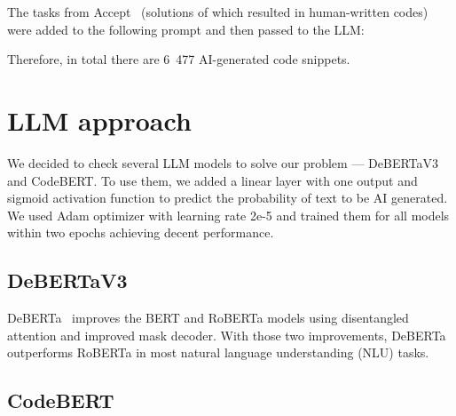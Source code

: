 \documentclass{article}
\begin{document}
The tasks from Accept~\cite{Beresnev} (solutions of which resulted in human-written codes) were added to the following prompt and then passed to the LLM:

\medskip
{}
\medskip

Therefore, in total there are 6~477 AI-generated code snippets.

\section{LLM approach}

We decided to check several LLM models to solve our problem --- DeBERTaV3 and CodeBERT. To use them, we added a linear layer with one output and sigmoid activation function to predict the probability of text to be AI generated. We used Adam optimizer with learning rate 2e-5 and trained them for all models within two epochs achieving decent performance.

\subsection{DeBERTaV3}

DeBERTa~\cite{He2023} improves the BERT and RoBERTa models using disentangled attention and improved mask decoder. With those two improvements, DeBERTa outperforms RoBERTa in most natural language understanding (NLU) tasks.

\subsection{CodeBERT}
\end{document}
